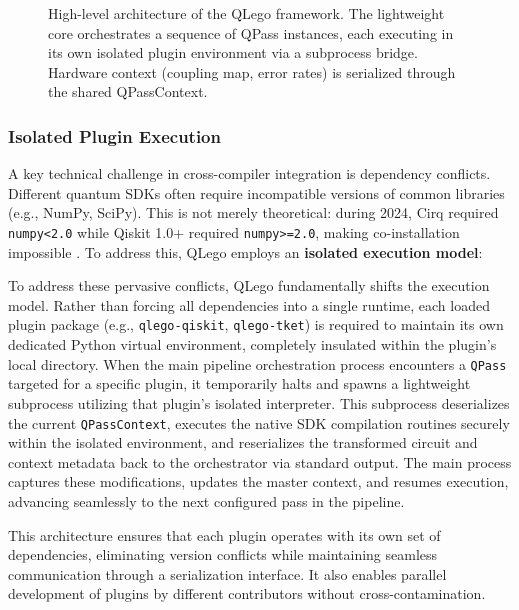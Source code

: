 \documentclass[conference]{IEEEtran}
\begin{document}
\begin{figure}[!t]
    \centering
    \caption{High-level architecture of the QLego framework. The lightweight core orchestrates a sequence of QPass instances, each executing in its own isolated plugin environment via a subprocess bridge. Hardware context (coupling map, error rates) is serialized through the shared QPassContext.}
\label{fig:architecture}
\end{figure}

\subsubsection{Isolated Plugin Execution}

A key technical challenge in cross-compiler integration is dependency conflicts. Different quantum SDKs often require incompatible versions of common libraries (e.g., NumPy, SciPy). This is not merely theoretical: during 2024, Cirq required \texttt{numpy<2.0} while Qiskit 1.0+ required \texttt{numpy>=2.0}, making co-installation impossible \cite{benchpress}. To address this, QLego employs an \textbf{isolated execution model}:

To address these pervasive conflicts, QLego fundamentally shifts the execution model. Rather than forcing all dependencies into a single runtime, each loaded plugin package (e.g., \texttt{qlego-qiskit}, \texttt{qlego-tket}) is required to maintain its own dedicated Python virtual environment, completely insulated within the plugin's local directory. When the main pipeline orchestration process encounters a \texttt{QPass} targeted for a specific plugin, it temporarily halts and spawns a lightweight subprocess utilizing that plugin's isolated interpreter. This subprocess deserializes the current \texttt{QPassContext}, executes the native SDK compilation routines securely within the isolated environment, and reserializes the transformed circuit and context metadata back to the orchestrator via standard output. The main process captures these modifications, updates the master context, and resumes execution, advancing seamlessly to the next configured pass in the pipeline.

This architecture ensures that each plugin operates with its own set of dependencies, eliminating version conflicts while maintaining seamless communication through a serialization interface. It also enables parallel development of plugins by different contributors without cross-contamination.
\end{document}
